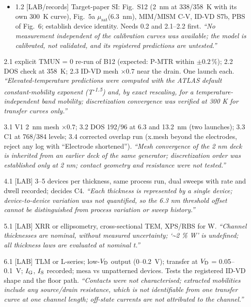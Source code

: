 \begin{description}
\begin{itemize}
    \item 1.2 [LAB/records] Target-paper SI: Fig.~S12 (2~nm at 338/358~K with its own 300~K curve), Fig.~5a $\mu_{\mathrm{sat}}$(6.3~nm), MIM/MISM C-V, ID-VD S7b, PBS of Fig.~6; establish device identity. Needs 0.2 and 2.1--2.2 first. \emph{``No measurement independent of the calibration curves was available; the model is calibrated, not validated, and its registered predictions are untested.''}
  \end{itemize}
  \item[Tier 2 (ATLAS; before a registered prediction is compared).] 2.1 explicit TMUN = 0 re-run of B12 (expected: P-MTR within $\pm0.2$\,\%); 2.2 DOS check at 358~K; 2.3 ID-VD mesh $\times0.7$ near the drain. One launch each. \emph{``Elevated-temperature predictions were computed with the ATLAS default constant-mobility exponent (T\textsuperscript{-1.5}) and, by exact rescaling, for a temperature-independent band mobility; discretization convergence was verified at 300 K for transfer curves only.''}
  \item[Tier 3 (ATLAS numerical closure).] 3.1 V1 2~nm mesh $\times0.7$; 3.2 DOS 192/96 at 6.3 and 13.2~nm (two launches); 3.3 C1 at 768/384 levels; 3.4 corrected overlap run (x.mesh beyond the electrodes, reject any log with ``Electrode shortened''). \emph{``Mesh convergence of the 2 nm deck is inherited from an earlier deck of the same generator; discretization order was established only at 2 nm; contact geometry and resistance were not tested.''}
  \item[Tier 4 (replicates; before any film-specific claim).] 4.1 [LAB] 3--5 devices per thickness, same process run, dual sweeps with rate and dwell recorded; decides C4. \emph{``Each thickness is represented by a single device; device-to-device variation was not quantified, so the 6.3 nm threshold offset cannot be distinguished from process variation or sweep history.''}
  \item[Tier 5 (thickness metrology; before any $t$-law).] 5.1 [LAB] XRR or ellipsometry, cross-sectional TEM, XPS/RBS for W. \emph{``Channel thicknesses are nominal, without measured uncertainty; `\textasciitilde 2 \% W' is undefined; all thickness laws are evaluated at nominal t.''}
  \item[Tier 6 (contacts and parasitic paths; needs 1, 5).] 6.1 [LAB] TLM or L-series; low-$V_{\mathrm{D}}$ output (0--0.2~V); transfer at $V_{\mathrm{D}}$ = 0.05--0.1~V; $I_{\mathrm{G}}$, $I_{\mathrm{S}}$ recorded; mesa vs unpatterned devices. Tests the registered ID-VD shape and the floor path. \emph{``Contacts were not characterised; extracted mobilities include any source/drain resistance, which is not identifiable from one transfer curve at one channel length; off-state currents are not attributed to the channel.''}

\end{description}
